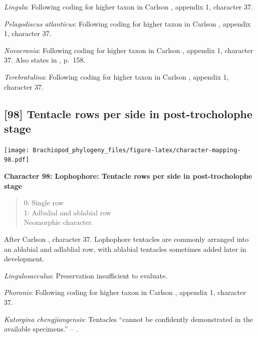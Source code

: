 \documentclass[openany]{book}
\theoremstyle{definition}
\theoremstyle{definition}
\theoremstyle{definition}
\theoremstyle{remark}
\begin{document}
\emph{Lingula}: Following coding for higher taxon in Carlson
\citeyearpar{Carlson1995Phylogeneticrelationships}, appendix 1,
character 37.

\emph{Pelagodiscus atlanticus}: Following coding for higher taxon in
Carlson \citeyearpar{Carlson1995Phylogeneticrelationships}, appendix 1,
character 37.

\emph{Novocrania}: Following coding for higher taxon in Carlson
\citeyearpar{Carlson1995Phylogeneticrelationships}, appendix 1,
character 37. Also states in
\citet{Williams2000BrachiopodaLinguliformea}, p.~158.

\emph{Terebratulina}: Following coding for higher taxon in Carlson
\citeyearpar{Carlson1995Phylogeneticrelationships}, appendix 1,
character 37.

\hypertarget{tentacle-rows-per-side-in-post-trocholophe-stage}{%
\subsection*{{[}98{]} Tentacle rows per side in post-trocholophe
stage}\label{tentacle-rows-per-side-in-post-trocholophe-stage}}

\texttt{[image: Brachiopod\_phylogeny\_files/figure-latex/character-mapping-98.pdf]}

\textbf{Character 98: Lophophore: Tentacle rows per side in
post-trocholophe stage}

\begin{quote}
0: Single row\\
1: Adbalial and ablabial row\\
Neomorphic character.
\end{quote}

After Carlson \citeyearpar{Carlson1995Phylogeneticrelationships},
character 37. Lophophore tentacles are commonly arranged into an
ablabial and adlablial row, with ablabial tentacles sometimes added
later in development.

\emph{Lingulosacculus}: Preservation insufficient to evaluate.

\emph{Phoronis}: Following coding for higher taxon in Carlson
\citeyearpar{Carlson1995Phylogeneticrelationships}, appendix 1,
character 37.

\emph{Kutorgina chengjiangensis}: Tentacles ``cannot be confidently
demonstrated in the available specimens.'' --
\citet{Zhang2007Rhynchonelliformeanbrachiopods}.
\end{document}
